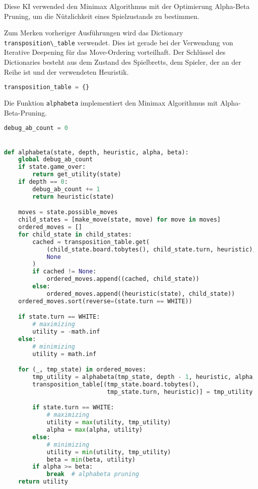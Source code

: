 Diese KI verwended den Minimax Algorithmus mit der Optimierung
Alpha-Beta Pruning, um die Nützlichkeit eines Spielzustands zu
bestimmen.

Zum Merken vorheriger Ausführungen wird das Dictionary
\passthrough{\lstinline!transposition\_table!} verwendet. Dies ist
gerade bei der Verwendung von Iterative Deepening für das Move-Ordering
vorteilhaft. Der Schlüssel des Dictionaries besteht aus dem Zustand des
Spielbretts, dem Spieler, der an der Reihe ist und der verwendeten
Heuristik.

\begin{lstlisting}[language=Python]
transposition_table = {}
\end{lstlisting}

Die Funktion \passthrough{\lstinline!alphabeta!} implementiert den
Minimax Algorithmus mit Alpha-Beta-Pruning.

\begin{lstlisting}[language=Python]
debug_ab_count = 0


def alphabeta(state, depth, heuristic, alpha, beta):
    global debug_ab_count
    if state.game_over:
        return get_utility(state)
    if depth == 0:
        debug_ab_count += 1
        return heuristic(state)

    moves = state.possible_moves
    child_states = [make_move(state, move) for move in moves]
    ordered_moves = []
    for child_state in child_states:
        cached = transposition_table.get(
            (child_state.board.tobytes(), child_state.turn, heuristic),
            None
        )
        if cached != None:
            ordered_moves.append((cached, child_state))
        else:
            ordered_moves.append((heuristic(state), child_state))
    ordered_moves.sort(reverse=(state.turn == WHITE))

    if state.turn == WHITE:
        # maximizing
        utility = -math.inf
    else:
        # minimizing
        utility = math.inf

    for (_, tmp_state) in ordered_moves:
        tmp_utility = alphabeta(tmp_state, depth - 1, heuristic, alpha, beta)
        transposition_table[(tmp_state.board.tobytes(),
                             tmp_state.turn, heuristic)] = tmp_utility

        if state.turn == WHITE:
            # maximizing
            utility = max(utility, tmp_utility)
            alpha = max(alpha, utility)
        else:
            # minimizing
            utility = min(utility, tmp_utility)
            beta = min(beta, utility)
        if alpha >= beta:
            break  # alphabeta pruning
    return utility
\end{lstlisting}

